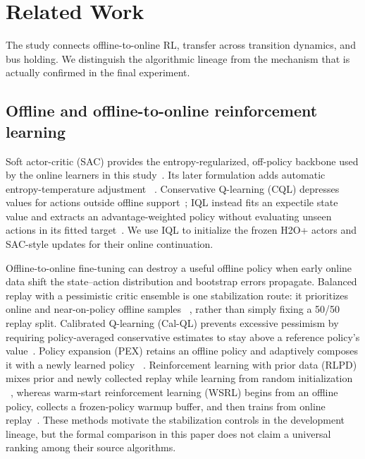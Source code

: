 \section{Related Work}
\label{sec:related}

The study connects offline-to-online RL, transfer across transition dynamics,
and bus holding. We distinguish the algorithmic lineage from the mechanism
that is actually confirmed in the final experiment.

\subsection{Offline and offline-to-online reinforcement learning}

Soft actor-critic (SAC) provides the entropy-regularized, off-policy backbone
used by the online learners in this study~\citep{haarnoja2018soft}. Its later
formulation adds automatic entropy-temperature adjustment
~\citep{haarnoja2018applications}.
Conservative Q-learning (CQL) depresses values for actions outside offline
support~\citep{kumar2020cql}; IQL instead fits an
expectile state value and extracts an advantage-weighted policy without
evaluating unseen actions in its fitted target~\citep{kostrikov2022iql}. We use
IQL to initialize the frozen H2O+ actors and SAC-style updates for their online
continuation.

Offline-to-online fine-tuning can destroy a useful offline policy when early
online data shift the state--action distribution and bootstrap errors
propagate. Balanced replay with a pessimistic critic ensemble is one
stabilization route: it prioritizes online and near-on-policy offline samples
~\citep{lee2022balanced}, rather than simply fixing a 50/50 replay split.
Calibrated Q-learning (Cal-QL) prevents excessive pessimism by requiring
policy-averaged conservative estimates to stay above a reference policy's
value~\citep{nakamoto2023calql}. Policy expansion (PEX) retains an
offline policy and adaptively composes it with a newly learned policy
~\citep{zhang2023pex}. Reinforcement learning with prior data (RLPD) mixes
prior and newly collected replay while learning from random initialization
~\citep{ball2023efficient}, whereas warm-start reinforcement learning (WSRL) begins
from an offline policy, collects a frozen-policy warmup buffer, and then trains
from online replay~\citep{zhou2025wsrl}. These methods motivate the stabilization
controls in the development lineage, but the formal comparison in this paper
does not claim a universal ranking among their source algorithms.

